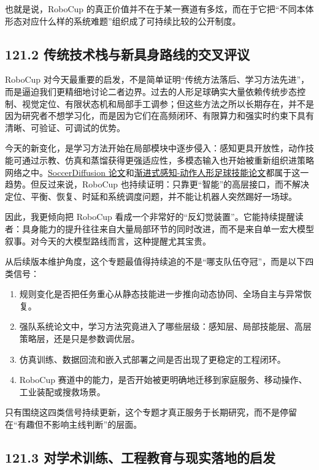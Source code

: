 也就是说，RoboCup 的真正价值并不在于某一赛道有多炫，而在于它把“不同本体形态对应什么样的系统难题”组织成了可持续比较的公开制度。

\subsection*{121.2 传统技术栈与新具身路线的交叉评议}


RoboCup 对今天最重要的启发，不是简单证明“传统方法落后、学习方法先进”，而是逼迫我们更精细地讨论二者边界。过去的人形足球确实大量依赖传统步态控制、视觉定位、有限状态机和局部手工调参；但这些方法之所以长期存在，并不是因为研究者不想学习化，而是因为它们在高频闭环、有限算力和强实时约束下具有清晰、可验证、可调试的优势。

今天的新变化，是学习方法开始在局部模块中逐步侵入：感知更具开放性，动作技能可通过示教、仿真和蒸馏获得更强适应性，多模态输入也开始被重新组织进策略网络之中。\href{https://arxiv.org/abs/2504.20808}{SoccerDiffusion 论文}和\href{https://arxiv.org/abs/2602.05310}{渐进式感知-动作人形足球技能论文}都属于这一趋势。但反过来说，RoboCup 也持续证明：只靠更“智能”的高层接口，而不解决定位、平衡、恢复、时延和系统调度问题，并不能让机器人突然踢好一场球。

因此，我更倾向把 RoboCup 看成一个非常好的“反幻觉装置”。它能持续提醒读者：具身能力的提升往往来自大量局部环节的同时改进，而不是来自单一宏大模型叙事。对今天的大模型路线而言，这种提醒尤其宝贵。

从后续版本维护角度，这个专题最值得持续追的不是“哪支队伍夺冠”，而是以下四类信号：

\begin{enumerate}
\item 规则变化是否把任务重心从静态技能进一步推向动态协同、全场自主与异常恢复。
\item 强队系统论文中，学习方法究竟进入了哪些层级：感知层、局部技能层、高层策略层，还是只是参数调优层。
\item 仿真训练、数据回流和嵌入式部署之间是否出现了更稳定的工程闭环。
\item RoboCup 赛道中的能力，是否开始被更明确地迁移到家庭服务、移动操作、工业装配或搜救场景。
\end{enumerate}

只有围绕这四类信号持续更新，这个专题才真正服务于长期研究，而不是停留在“有趣但不影响主线判断”的层面。

\subsection*{121.3 对学术训练、工程教育与现实落地的启发}


